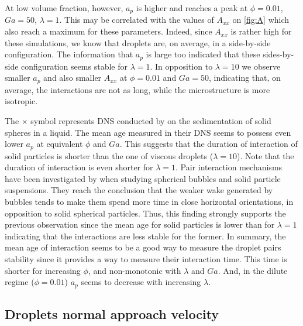 At low volume fraction, however, $a_p$ is higher and reaches a peak at $\phi=0.01$, $Ga=50$, $\lambda=1$.
This may be correlated with the values of $A_{xx}$ on \ref{fig:A} which also reach a maximum for these parameters. 
Indeed, since $A_{xx}$ is rather high for these simulations, we know that droplets are, on average, in a side-by-side configuration.
The information that $a_p$ is large too indicated that these sides-by-side configuration seems stable for $\lambda = 1$. 
In opposition to $\lambda = 10$ we observe smaller $a_p$ and also smaller $A_{xx}$ at $\phi = 0.01$ and $Ga = 50$, indicating that, on average, the interactions are not as long, while the microstructure is more isotropic. 

The $\pmb\times$ symbol represents DNS conducted by \citet{zhang2023evolution} on the sedimentation of solid spheres in a liquid. 
The mean age measured in their DNS seems to possess even lower $a_p$ at equivalent $\phi$ and $Ga$. 
This suggests that the duration of interaction of solid particles is shorter than the one of viscous droplets ($\lambda = 10$).
Note that the duration of interaction is even shorter for $\lambda = 1$. 
Pair interaction mechanisms have been investigated by \citet{yin2008lattice} when studying spherical bubbles and solid particle suspensions.
They reach the conclusion that the weaker wake generated by bubbles tends to make them spend more time in close horizontal orientations, in opposition to solid spherical particles. 
Thus, this finding strongly supports the previous observation since the mean age for solid particles is lower than for $\lambda = 1$ indicating that the interactions are less stable for the former. 
In summary, the mean age of interaction seems to be a good way to measure the droplet pairs stability since it provides a way to measure their interaction time. 
This time is shorter for increasing $\phi$, and non-monotonic with $\lambda$ and $Ga$. 
And, in the dilute regime ($\phi = 0.01$) $a_p$ seems to decrease with increasing $\lambda$. 

\subsection{Droplets normal approach velocity}

